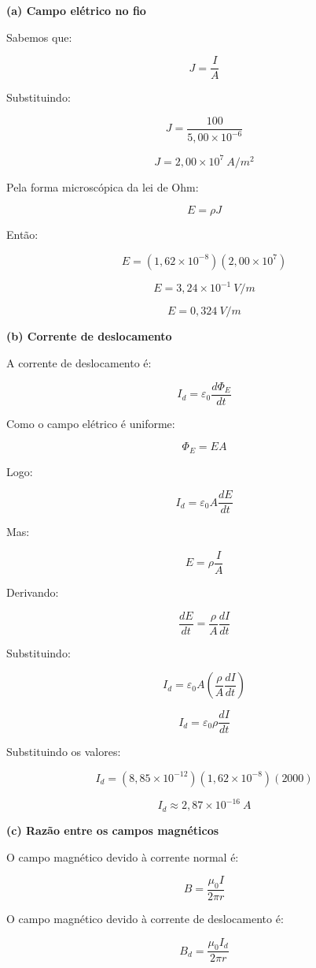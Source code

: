 \documentclass[12pt,a4paper]{article}
\begin{document}
\textbf{(a) Campo elétrico no fio}

Sabemos que:

\[
J=\frac{I}{A}
\]

Substituindo:

\[
J=\frac{100}{5,00\times10^{-6}}
\]

\[
J=2,00\times10^7\ A/m^2
\]

Pela forma microscópica da lei de Ohm:

\[
E=\rho J
\]

Então:

\[
E=(1,62\times10^{-8})(2,00\times10^7)
\]

\[
E=3,24\times10^{-1}\ V/m
\]

\[
E=0,324\ V/m
\]

\vspace{0.5cm}

\textbf{(b) Corrente de deslocamento}

A corrente de deslocamento é:

\[
I_d=\varepsilon_0\frac{d\Phi_E}{dt}
\]

Como o campo elétrico é uniforme:

\[
\Phi_E=EA
\]

Logo:

\[
I_d=\varepsilon_0A\frac{dE}{dt}
\]

Mas:

\[
E=\rho\frac{I}{A}
\]

Derivando:

\[
\frac{dE}{dt}
=
\frac{\rho}{A}\frac{dI}{dt}
\]

Substituindo:

\[
I_d
=
\varepsilon_0A
\left(
\frac{\rho}{A}\frac{dI}{dt}
\right)
\]

\[
I_d
=
\varepsilon_0\rho\frac{dI}{dt}
\]

Substituindo os valores:

\[
I_d
=
(8,85\times10^{-12})
(1,62\times10^{-8})
(2000)
\]

\[
I_d\approx2,87\times10^{-16}\ A
\]

\vspace{0.5cm}

\textbf{(c) Razão entre os campos magnéticos}

O campo magnético devido à corrente normal é:

\[
B=\frac{\mu_0 I}{2\pi r}
\]

O campo magnético devido à corrente de deslocamento é:

\[
B_d=\frac{\mu_0 I_d}{2\pi r}
\]
\end{document}
